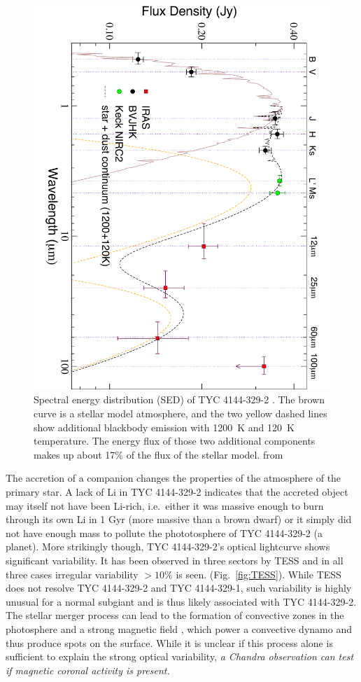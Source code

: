 \documentclass[letterpaper,11pt]{article}
\begin{document}
\begin{figure}
\includegraphics[angle=90,width=.5\textwidth]{SED}
\caption{Spectral energy distribution (SED) of TYC 4144-329-2 . The brown curve is a stellar model atmosphere, and the two yellow dashed lines show additional blackbody emission with 1200~K and 120~K temperature. The energy flux of those two additional components makes up about 17\% of the flux of the stellar model. from \cite{2009ApJ...696.1964M} }
\label{fig:SED}
\end{figure}


The accretion of a companion changes the properties of the atmosphere of the primary star. A lack of Li in TYC 4144-329-2 \cite{2009ApJ...696.1964M} indicates that the accreted object may itself not have been Li-rich, i.e.\ either it was massive enough to burn through its own Li in 1 Gyr (more massive than a brown dwarf) or it simply did not have enough mass to pollute the phototosphere of TYC 4144-329-2 (a planet). More strikingly though, TYC 4144-329-2's optical lightcurve shows significant variability. It has been observed in three sectors by TESS and in all three cases irregular variability $>10\%$ is seen. (Fig.~\ref{fig:TESS}). While TESS does not resolve TYC 4144-329-2 and TYC 4144-329-1, such variability is highly unusual for a normal subgiant and is thus likely associated with TYC 4144-329-2. The stellar merger process can lead to the formation of convective zones in the photosphere \cite{Soker&Tylenda2007} and a strong magnetic field \cite{Schneider+2016}, which power a convective dynamo and thus produce spots on the surface. While it is unclear if this process alone is sufficient to explain the strong optical variability, \textit{a Chandra observation can test if magnetic coronal activity is present.}
\end{document}

